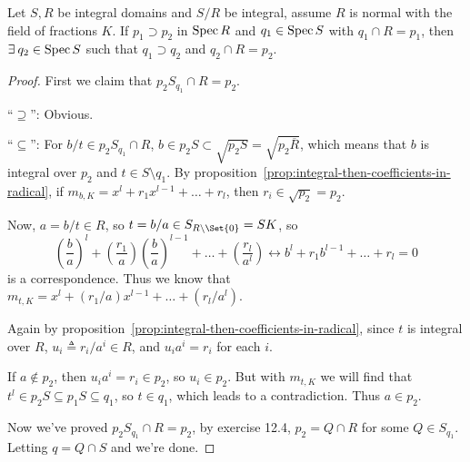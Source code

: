 \begin{theorem} \label{thm:going-down}
  Let $S, R$ be integral domains and $S/R$ be integral, assume $R$ is normal
  with the field of fractions $K$. If $p_1 \supset p_2$ in $\operatorname{Spec} R$ and $q_1 \in \operatorname{Spec} S$
  with $q_1 \cap R = p_1$,
  then $\exists q_2 \in \Spec S$ such that $q_1 \supset q_2$ and $q_2 \cap R = p_2$.

  \begin{proof}
    First we claim that $p_2 S_{q_1} \cap R = p_2$.

    ``$\supseteq$'': Obvious.

    ``$\subseteq$'': For $b/t \in p_2 S_{q_1} \cap R$, $b \in p_2 S \subset \sqrt{p_2 S}
    = \sqrt{p_2 \overline{R}}$, which means that $b$ is integral over $p_2$
    and $t \in S \setminus q_1$. By proposition~\ref{prop:integral-then-coefficients-in-radical},
    if $m_{b, K} = x^l + r_1 x^{l-1} + \dots + r_l$, then $r_i \in \sqrt{p_2} = p_2$.

    Now, $a = b/t \in R$, so $t = b/a \in S_{R \setminus \Set{0}} = SK$,
    so
    \[ \left( \frac{b}{a} \right)^l + 
      \left(\frac{r_1}{a}\right) \left( \frac{b}{a} \right)^{l-1} + \dots
      + \left(\frac{r_l}{a^l}\right) \leftrightarrow b^l + r_1 b^{l-1} + \dots + r_l = 0 \]
    is a correspondence. Thus we know that
    $m_{t, K} = x^l + (r_1/a) x^{l-1} + \dots + (r_l/a^l)$.

    Again by proposition~\ref{prop:integral-then-coefficients-in-radical},
    since $t$ is integral over $R$, $u_i \triangleq r_i / a^i \in R$,
    and $u_i a^i = r_i$ for each $i$.

    If $a \notin p_2$, then $u_i a^i = r_i \in p_2$, so $u_i \in p_2$.
    But with $m_{t, K}$ we will find that $t^l \in p_2 S \subseteq p_1 S \subseteq q_1$,
    so $t \in q_1$, which leads to a contradiction. Thus $a \in p_2$.

    Now we've proved $p_2 S_{q_1} \cap R = p_2$,
    by exercise 12.4, $p_2 = Q \cap R$ for some $Q \in S_{q_1}$.
    Letting $q = Q \cap S$ and we're done.
  \end{proof}
\end{theorem}

